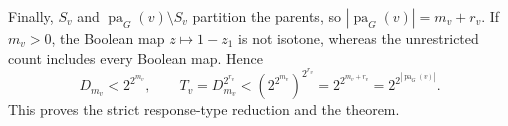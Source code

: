 Finally, \(S_v\) and \(\operatorname{pa}_G(v)\setminus S_v\) partition the parents, so \(|\operatorname{pa}_G(v)|=m_v+r_v\).  If \(m_v>0\), the Boolean map \(z\mapsto1-z_1\) is not isotone, whereas the unrestricted count includes every Boolean map.  Hence
\[
 D_{m_v}<2^{2^{m_v}},
 \qquad
 T_v=D_{m_v}^{2^{r_v}}
 <\left(2^{2^{m_v}}\right)^{2^{r_v}}
 =2^{2^{m_v+r_v}}
 =2^{2^{|\operatorname{pa}_G(v)|}}.
\]
This proves the strict response-type reduction and the theorem.